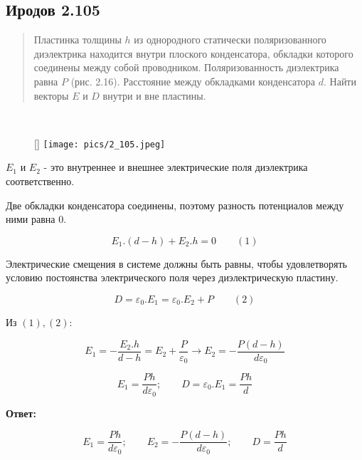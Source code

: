 \subsection*{Иродов 2.105}

\setcounter{equation}{0}

\begin{abstract}
Пластинка толщины $h$ из однородного статически поляризованного диэлектрика находится внутри плоского конденсатора, обкладки которого соединены между собой проводником. Поляризованность диэлектрика равна $P$ (рис. 2.16). Расстояние между обкладками конденсатора $d$. Найти векторы
$E$ и $D$ внутри и вне пластины.
\end{abstract}

\noindent \hrulefill
\\
\begin{wrapfigure}[6]{r}{0.30\textwidth}
	\raisebox{0pt}[\dimexpr{}\baselineskip\relax]{
	\texttt{[image: pics/2\_105.jpeg]}}
\end{wrapfigure}

$E_1$ и $E_2$ - это внутреннее и внешнее электрические поля диэлектрика соответственно.

Две обкладки конденсатора соединены, поэтому разность потенциалов между ними равна 0.

$$E_1.(d-h) + E_2.h = 0 \qquad (1)$$

Электрические смещения в системе должны быть равны, чтобы удовлетворять условию постоянства электрического поля через диэлектрическую пластину.

$$D = \varepsilon_0 . E_1 = \varepsilon_0 . E_2 + P \qquad (2)$$

Из $(1), (2):$

$$E_1 = - \frac{E_2.h}{d-h} = E_2 + \frac{P}{\varepsilon_0} \xrightarrow[]{} E_2 = -\frac{P(d-h)}{d \varepsilon_0}$$

$$E_1 = \frac{Ph}{d \varepsilon_0}; \qquad D = \varepsilon_0 . E_1 = \frac{Ph}{d}$$

\textbf{Ответ:}

$$E_1 = \frac{Ph}{d \varepsilon_0}; \qquad E_2 = -\frac{P(d-h)}{d \varepsilon_0}; \qquad D =  \frac{Ph}{d}$$







